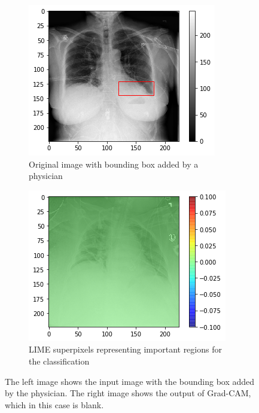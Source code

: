 \begin{figure}[H]
    \centering
    \begin{subfigure}[t]{.45\textwidth}
        \centering
        \includegraphics[width=\linewidth]{chapters/03_classification/images/rise1_bbox.png}
        \caption{Original image with bounding box added by a physician}
    \end{subfigure}\hspace{1cm}%
    \begin{subfigure}[t]{.45\textwidth}
        \centering
        \includegraphics[width=\linewidth]{chapters/03_classification/images/grad-cam_0.png}
        \caption{LIME superpixels representing important regions for the classification}
    \end{subfigure}
    \caption{The left image shows the input image with the bounding box added by the physician. The right image shows the output of Grad-CAM, which in this case is blank.}
\label{grad_cam_example_1}
\end{figure}

